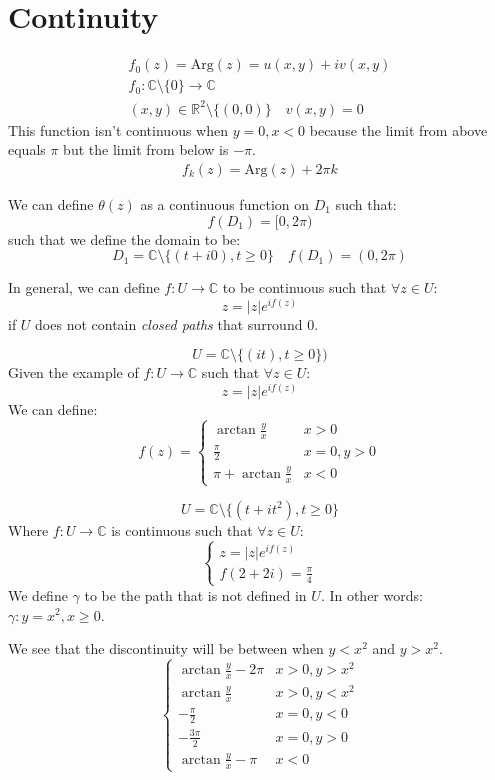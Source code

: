 \documentclass[00_complete]{subfiles}
\begin{document}
\section{Continuity}
\begin{example}
    \begin{gather*}
        f_0(z)=\mathrm{Arg}(z)=u(x,y)+iv(x,y) \\ 
        f_0: \mathbb{C} \setminus \{0\} \to \mathbb{C} \\ 
        (x,y) \in \mathbb{R}^2 \setminus \{(0,0)\} \quad v(x,y)=0
    \end{gather*}
    This function isn't continuous when $y=0, x<0$ because the limit from above
    equals $\pi$ but the limit from below is $-\pi$.
    \begin{gather*}
        f_k(z)= \mathrm{Arg}(z) + 2\pi k
    \end{gather*}
\end{example}
\begin{note}
    We can define $ \theta(z) $ as a continuous function on $ D_1 $ such that:
    $$ f(D_1)=[0,2\pi) $$
    such that we define the domain to be:
    $$ D_1 = \mathbb{C} \setminus \{(t+i0), t \geq 0\} \quad f(D_1)=(0,2\pi)$$
\end{note}
In general, we can define $f: U \to \mathbb{C}$ to be continuous such that 
$ \forall z \in U $: $$ z= |z|e^{if(z)} $$
if $ U $ does not contain \textit{closed paths} that surround $ 0 $.
\begin{example}
    $$ U = \mathbb{C} \setminus \{(it), t\geq 0\}) $$
    Given the example of $ f: U \to \mathbb{C} $ such that $ \forall z \in U $:
    $$ z=|z|e^{if(z)} $$
    We can define:
    $$ f(z) = \begin{cases}
        \arctan{\frac{y}{x}} & x > 0 \\ 
        \frac{\pi}{2} & x= 0, y> 0 \\ 
        \pi + \arctan{\frac{y}{x}} & x < 0
    \end{cases} $$
\end{example}
\begin{example}
    $$ U = \mathbb{C} \setminus \{(t+it^2), t \geq 0\} $$
    Where $ f: U \to \mathbb{C} $ is continuous such that $ \forall z \in U $:
    $$ \begin{cases}
        z = |z|e^{if(z)} \\ f(2+2i)=\frac{\pi}{4}
    \end{cases} $$
    We define $ \gamma $ to be the path that is not defined in $ U $.
    In other words: $ \gamma: y=x^2, x \geq 0 $.

    We see that the discontinuity will be between when $ y<x^2 $ and $ y>x^2 $.
    $$ \begin{cases}
        \arctan{\frac{y}{x}} - 2\pi& x>0, y>x^2 \\ 
        \arctan{\frac{y}{x}} & x>0, y<x^2 \\
        -\frac{\pi}{2} & x = 0, y < 0\\ 
        -\frac{3\pi}{2} & x=0, y > 0 \\ 
        \arctan{\frac{y}{x}}-\pi &  x < 0
    \end{cases} $$
\end{example}
\end{document}
